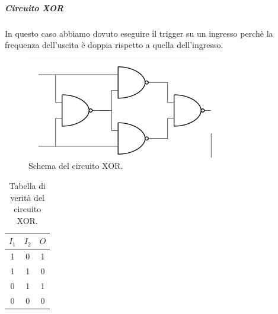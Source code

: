 \documentclass[10pt,a4paper]{article}
\begin{document}
\subparagraph{Circuito XOR}
In questo caso abbiamo dovuto eseguire il trigger su un ingresso perchè la frequenza dell'uscita è doppia rispetto a quella dell'ingresso.


\begin{figure}[!htb]
  \centering
  \includegraphics[scale=0.5]{XOR.png}
\caption{Schema del circuito XOR.\label{fig:XOR}}
\end{figure}


\begin{table}[!htb]
\centering
\begin{tabular}{|c|c|c|}
\hline 
$I_1$ & $I_2$ & $O$ \\
\hline
 1 &  0 & 1\\ 
 
 1 &  1 & 0\\ 

 0 &  1 & 1\\ 

 0 &  0 & 0\\ 
\hline 
\end{tabular} 
\caption{Tabella di verità del circuito XOR.\label{tab:XOR}}
\end{table}
\end{document}

